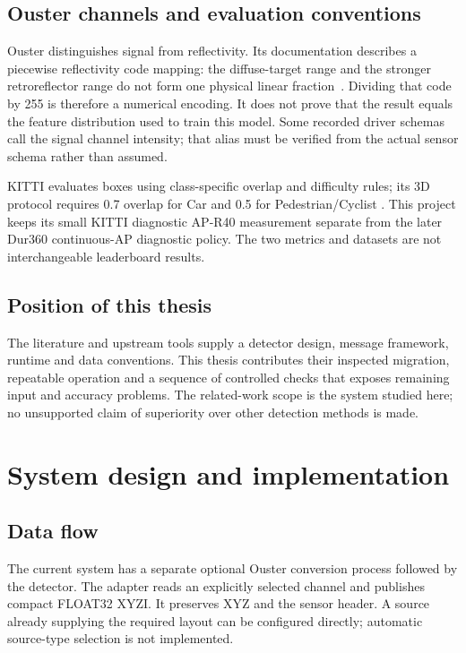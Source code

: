 \documentclass[11pt,a4paper]{article}
\begin{document}
\subsection{Ouster channels and evaluation conventions}
Ouster distinguishes signal from reflectivity. Its documentation describes a
piecewise reflectivity code mapping: the diffuse-target range and the stronger
retroreflector range do not form one physical linear fraction~\cite{ousterdata}.
Dividing that code by 255 is therefore a numerical encoding. It does not prove
that the result equals the feature distribution used to train this model.
Some recorded driver schemas call the signal channel intensity; that alias
must be verified from the actual sensor schema rather than assumed.

KITTI evaluates boxes using class-specific overlap and difficulty rules; its
3D protocol requires 0.7 overlap for Car and 0.5 for Pedestrian/Cyclist
\cite{kittiprotocol}. This project keeps its small KITTI diagnostic AP-R40
measurement separate from the later Dur360 continuous-AP diagnostic policy.
The two metrics and datasets are not interchangeable leaderboard results.

\subsection{Position of this thesis}
The literature and upstream tools supply a detector design, message framework,
runtime and data conventions. This thesis contributes their inspected migration,
repeatable operation and a sequence of controlled checks that exposes remaining
input and accuracy problems. The related-work scope is the system studied here;
no unsupported claim of superiority over other detection methods is made.

\section{System design and implementation}
\subsection{Data flow}
The current system has a separate optional Ouster conversion process followed by
the detector. The adapter reads an explicitly selected channel and publishes
compact FLOAT32 XYZI. It preserves XYZ and the sensor header. A source already
supplying the required layout can be configured directly; automatic source-type
selection is not implemented.
\end{document}
